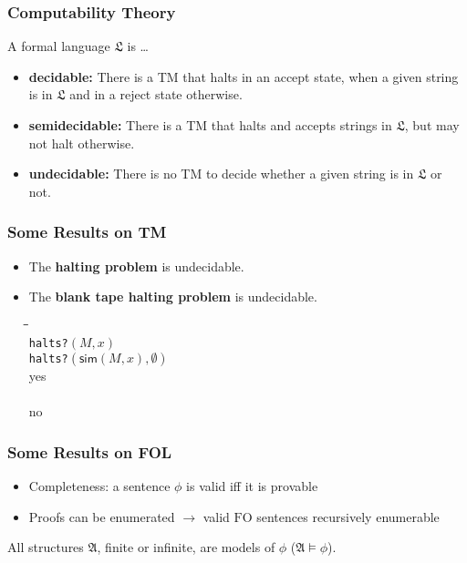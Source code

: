 \documentclass[handout]{beamer}
\newcommand{\FO}{\ensuremath{\mathrm{FO}}}
\newcommand{\structa}{\ensuremath{\mathfrak{A}}}
\begin{document}
\begin{frame}
  \frametitle{Computability Theory}

  A formal language $\mathfrak{L}$ is \ldots
  \begin{itemize}
    \item \textbf{decidable:} There is a TM that halts in an accept state, when
    a given string is in $\mathfrak{L}$ and in a reject state otherwise.
    \item \textbf{semidecidable:} There is a TM that halts and accepts
    strings in $\mathfrak{L}$, but may not halt otherwise.
    \item \textbf{undecidable:} There is no TM to decide whether a given string
    is in $\mathfrak{L}$ or not.
  \end{itemize}

  
\end{frame}

\begin{frame}
  \frametitle{Some Results on TM}

  \begin{itemize}
    \item The \textbf{halting problem} is undecidable.
    \item The \textbf{blank tape halting problem} is undecidable.
      \begin{center}
        \begin{boxedminipage}{.5\textwidth}
          \begin{tabbing}
            \quad\=\quad\=\quad\=\kill\\
                {\tt halts?}$(M,x)$\\
                 {\tt halts?}$(\mathsf{sim}(M, x), \emptyset)$\\
                \>\>yes\\
                \\
                \>\>no\\
          \end{tabbing}
        \end{boxedminipage}
      \end{center}
  \end{itemize}
  
\end{frame}

\begin{frame}
  \frametitle{Some Results on FOL}

  \begin{itemize}
    \item Completeness: a sentence $\phi$ is valid iff it is provable
    \item Proofs can be enumerated $\longrightarrow$ valid $\FO$ sentences
    recursively enumerable
  \end{itemize}

  \begin{definition}[Validity]
    All structures $\structa$, finite or infinite, are models of $\phi$
    ($\structa \models \phi$).
  \end{definition}
  
\end{frame}
\end{document}
